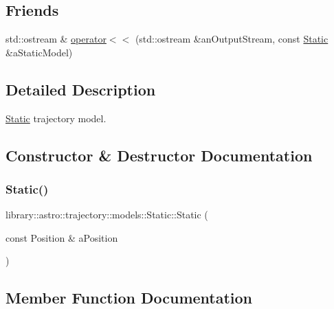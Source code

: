 \subsection*{Friends}
\begin{DoxyCompactItemize}
\item 
std\+::ostream \& \hyperlink{classlibrary_1_1astro_1_1trajectory_1_1models_1_1_static_a6494cb538d45101dc20cb3910455cb13}{operator$<$$<$} (std\+::ostream \&an\+Output\+Stream, const \hyperlink{classlibrary_1_1astro_1_1trajectory_1_1models_1_1_static}{Static} \&a\+Static\+Model)
\end{DoxyCompactItemize}


\subsection{Detailed Description}
\hyperlink{classlibrary_1_1astro_1_1trajectory_1_1models_1_1_static}{Static} trajectory model. 

\subsection{Constructor \& Destructor Documentation}
\mbox{\label{classlibrary_1_1astro_1_1trajectory_1_1models_1_1_static_a9d0fc36702a4c78adddc06f8490c83c8}} 
\subsubsection{\texorpdfstring{Static()}{Static()}}
{\footnotesize\ttfamily library\+::astro\+::trajectory\+::models\+::\+Static\+::\+Static (\begin{DoxyParamCaption}\item[{const Position \&}]{a\+Position }\end{DoxyParamCaption})}



\subsection{Member Function Documentation}
\mbox{\label{classlibrary_1_1astro_1_1trajectory_1_1models_1_1_static_ae4bc6aceab498868e4ebe2a65c6aa413}} 
